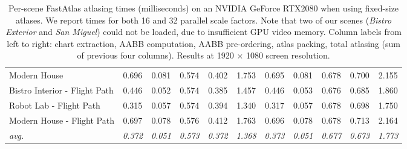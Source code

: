 \begin{table*}
\begin{tabular}{lccccc|ccccc}
Modern House                  & 0.696              & 0.081          & 0.574          & 0.402          & 1.753          & 0.695              & 0.081          & 0.678          & 0.700          & 2.155          \\
Bistro Interior - Flight Path & 0.446              & 0.052          & 0.574          & 0.385          & 1.457          & 0.446              & 0.053          & 0.676          & 0.685          & 1.860          \\
Robot Lab - Flight Path       & 0.315              & 0.057          & 0.574          & 0.394          & 1.340          & 0.317              & 0.057          & 0.678          & 0.698          & 1.750          \\
Modern House - Flight Path    & 0.697              & 0.078          & 0.576          & 0.412          & 1.763          & 0.696              & 0.078          & 0.678          & 0.713          & 2.164          \\
\hline
\textit{avg.}                 & \textit{0.372}     & \textit{0.051} & \textit{0.573} & \textit{0.372} & \textit{1.368} & \textit{0.373}     & \textit{0.051} & \textit{0.677} & \textit{0.673} & \textit{1.773} \\
\end{tabular}
\vspace{1mm}
\caption{Per-scene FastAtlas atlasing times (milliseconds) on an NVIDIA GeForce RTX2080 when using fixed-size atlases. We report times for both 16 and 32 parallel scale factors. Note that two of our scenes (\textit{Bistro Exterior} and \textit{San Miguel}) could not be loaded, due to insufficient GPU video memory. Column labels from left to right: chart extraction, AABB computation, AABB pre-ordering, atlas packing, total atlasing (sum of previous four columns). Results at 1920 $\times$ 1080 screen resolution.}
\label{tab:supp_runtime_2080}
\vspace{-3mm}
\end{table*}
